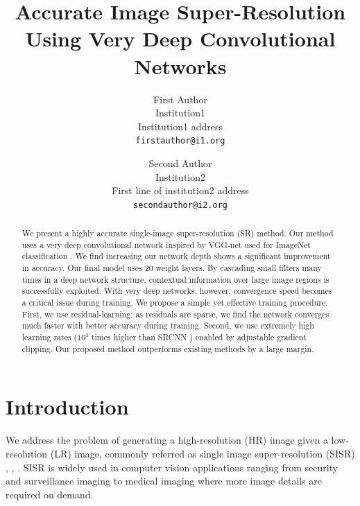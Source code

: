 \documentclass[10pt,twocolumn,letterpaper]{article}
\begin{document}
\title{Accurate Image Super-Resolution Using Very Deep Convolutional Networks}

\author{First Author\\
	Institution1\\
	Institution1 address\\
	{\tt\small firstauthor@i1.org}
	\and
	Second Author\\
	Institution2\\
	First line of institution2 address\\
	{\tt\small secondauthor@i2.org}
}

\maketitle


\begin{abstract}
We present a highly accurate single-image super-resolution (SR) method. Our method uses a very deep convolutional network inspired by VGG-net used for ImageNet classification \cite{simonyan2015very}. We find increasing our network depth shows a significant improvement in accuracy. Our final model uses 20 weight layers. By cascading small filters many times in a deep network structure, contextual information over large image regions is successfully exploited. With very deep networks, however, convergence speed becomes a critical issue during training. We propose a simple yet effective training procedure. First, we use residual-learning: as residuals are sparse, we find the network converges much faster with better accuracy during training. Second, we use extremely high learning rates ($10^4$ times higher than SRCNN \cite{dong2015image}) enabled by adjustable gradient clipping. Our proposed method outperforms existing methods by a large margin.
\end{abstract}

\section{Introduction}
We address the problem of generating a high-resolution (HR) image given a low-resolution (LR) image, commonly referred as single image super-resolution (SISR) \cite{Irani1991}, \cite{freeman2000learning}, \cite{glasner2009super}. SISR is widely used in computer vision applications ranging from security and surveillance imaging to medical imaging where more image details are required on demand.
\end{document}

